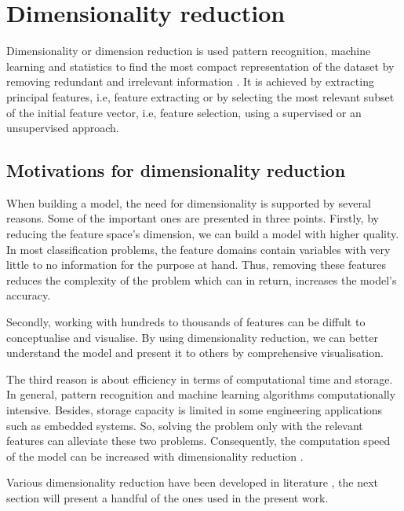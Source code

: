 \section{Dimensionality reduction}
Dimensionality or dimension reduction is used pattern recognition, machine learning and statistics to find the most compact representation of the dataset by removing redundant and irrelevant information \cite{effi2016}.
It is achieved by extracting principal features, i.e, feature extracting or by selecting the most relevant subset of the initial feature vector, i.e, feature selection, using a supervised or an unsupervised approach.

\subsection{Motivations for dimensionality reduction}
When building a model, the need for dimensionality is supported by several reasons. Some of the important ones are presented in three points.
Firstly, by reducing the feature space's dimension, we can build a model with higher quality\cite{newh2016}.
In most classification problems, the feature domains contain variables with very little to no information for the purpose at hand.
Thus, removing these features reduces the complexity of the problem which can in return, increases the model's accuracy.

Secondly, working with hundreds to thousands of features can be diffult to conceptualise and visualise. By using dimensionality reduction, we can better understand the model and present it to others by comprehensive visualisation\cite{newh2016}.

The third reason is about efficiency in terms of computational time and storage. In general, pattern recognition and machine learning algorithms computationally intensive. Besides, storage capacity is limited in some engineering applications such as embedded systems. So, solving the problem only with the relevant features can alleviate these two problems. Consequently, the computation speed of the model can be increased with dimensionality reduction \cite{hybr2011}.

Various dimensionality reduction have been developed in literature \cite{sima2013} \cite{effi2016} \cite{hybr2011} \cite{newh2016}, 
the next section will present a handful of the ones used in the present work. 


